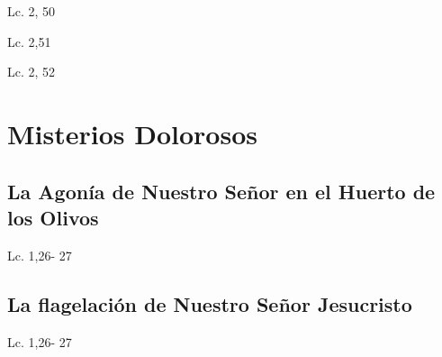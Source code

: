 \documentclass[a4paper,11pt,sans]{article}
\begin{document}
      \begin{multicols}{2}

      \columnbreak
          
      \end{multicols}
      \begin{center}
        Lc. 2, 50        
      \end{center}
      
      \begin{multicols}{2}

      \columnbreak
          
      \end{multicols}
      \begin{center}
        Lc. 2,51       
      \end{center}      
      
      \begin{multicols}{2}

      \columnbreak
          
      \end{multicols}
      \begin{center}
        Lc. 2, 52        
      \end{center}
            
    \newpage
        
  \section*{\hfil Misterios Dolorosos \hfil}
    \subsection*{\hfil La Agonía de Nuestro Señor en el Huerto de los Olivos \hfil}
      \begin{multicols}{2}

      \columnbreak
           
      \end{multicols}
      \begin{center}
        Lc. 1,26- 27           
      \end{center}
    \subsection*{\hfil La flagelación de Nuestro Señor Jesucristo \hfil}
        
      \begin{multicols}{2}

      \columnbreak
           
      \end{multicols}
      \begin{center}
        Lc. 1,26- 27           
      \end{center}
\end{document}
